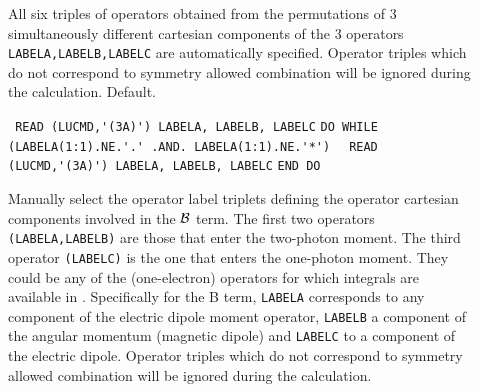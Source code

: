 \begin{description}
\item[] 
All six triples of operators obtained from the
permutations of 3 simultaneously different 
cartesian components of the 3 operators 
\verb+LABELA,LABELB,LABELC+ are automatically specified.
Operator triples which do not correspond to symmetry allowed
combination will be ignored during the calculation.
Default.

\item[] \verb| |\newline
\verb|READ (LUCMD,'(3A)') LABELA, LABELB, LABELC|\newline
\verb|DO WHILE (LABELA(1:1).NE.'.' .AND. LABELA(1:1).NE.'*')|\newline
\verb|  READ (LUCMD,'(3A)') LABELA, LABELB, LABELC|\newline
\verb|END DO|
%

Manually select the operator label triplets defining the operator
cartesian components involved in the ${\cal B}$ term. 
The first two operators \verb+(LABELA,LABELB)+
are those that enter the two-photon moment.
The third operator \verb+(LABELC)+ 
is the one that enters the one-photon 
moment. They could be any of the (one-electron)
operators for which integrals are available in 
.
Specifically for the B term, \verb+LABELA+
corresponds to any component of the electric dipole 
moment operator, \verb+LABELB+ a component of the
angular momentum (magnetic dipole) and
\verb+LABELC+ to a component of the electric dipole.
Operator triples which do not correspond to symmetry allowed
combination will be ignored during the calculation.


\end{description}
